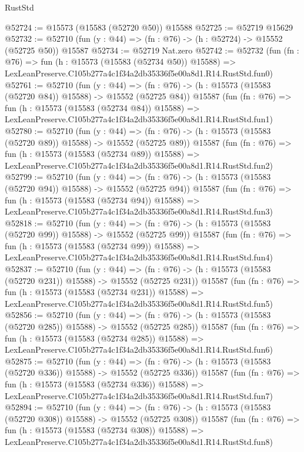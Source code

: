 \begin{lexlean}{RustStd}
\begin{coremodule}
@52724 := @15573 (@15583 (@52720 @50)) @15588
@52725 := @52719 @15629
@52732 := @52710 (fun (y : @44) => (fn : @76) -> (h : @52724) -> @15552 (@52725 @50)) @15587
@52734 := @52719 Nat.zero
@52742 := @52732
    (fun (fn : @76) =>
    fun (h : @15573 (@15583 (@52734 @50)) @15588) =>
    LexLeanPreserve.C105b277a4c1f34a2db35336f5e00a8d1.R14.RustStd.fun0)
@52761 := @52710
    (fun (y : @44) =>
    (fn : @76) -> (h : @15573 (@15583 (@52720 @84)) @15588) -> @15552 (@52725 @84))
    @15587
    (fun (fn : @76) =>
    fun (h : @15573 (@15583 (@52734 @84)) @15588) =>
    LexLeanPreserve.C105b277a4c1f34a2db35336f5e00a8d1.R14.RustStd.fun1)
@52780 := @52710
    (fun (y : @44) =>
    (fn : @76) -> (h : @15573 (@15583 (@52720 @89)) @15588) -> @15552 (@52725 @89))
    @15587
    (fun (fn : @76) =>
    fun (h : @15573 (@15583 (@52734 @89)) @15588) =>
    LexLeanPreserve.C105b277a4c1f34a2db35336f5e00a8d1.R14.RustStd.fun2)
@52799 := @52710
    (fun (y : @44) =>
    (fn : @76) -> (h : @15573 (@15583 (@52720 @94)) @15588) -> @15552 (@52725 @94))
    @15587
    (fun (fn : @76) =>
    fun (h : @15573 (@15583 (@52734 @94)) @15588) =>
    LexLeanPreserve.C105b277a4c1f34a2db35336f5e00a8d1.R14.RustStd.fun3)
@52818 := @52710
    (fun (y : @44) =>
    (fn : @76) -> (h : @15573 (@15583 (@52720 @99)) @15588) -> @15552 (@52725 @99))
    @15587
    (fun (fn : @76) =>
    fun (h : @15573 (@15583 (@52734 @99)) @15588) =>
    LexLeanPreserve.C105b277a4c1f34a2db35336f5e00a8d1.R14.RustStd.fun4)
@52837 := @52710
    (fun (y : @44) =>
    (fn : @76) -> (h : @15573 (@15583 (@52720 @231)) @15588) -> @15552 (@52725 @231))
    @15587
    (fun (fn : @76) =>
    fun (h : @15573 (@15583 (@52734 @231)) @15588) =>
    LexLeanPreserve.C105b277a4c1f34a2db35336f5e00a8d1.R14.RustStd.fun5)
@52856 := @52710
    (fun (y : @44) =>
    (fn : @76) -> (h : @15573 (@15583 (@52720 @285)) @15588) -> @15552 (@52725 @285))
    @15587
    (fun (fn : @76) =>
    fun (h : @15573 (@15583 (@52734 @285)) @15588) =>
    LexLeanPreserve.C105b277a4c1f34a2db35336f5e00a8d1.R14.RustStd.fun6)
@52875 := @52710
    (fun (y : @44) =>
    (fn : @76) -> (h : @15573 (@15583 (@52720 @336)) @15588) -> @15552 (@52725 @336))
    @15587
    (fun (fn : @76) =>
    fun (h : @15573 (@15583 (@52734 @336)) @15588) =>
    LexLeanPreserve.C105b277a4c1f34a2db35336f5e00a8d1.R14.RustStd.fun7)
@52894 := @52710
    (fun (y : @44) =>
    (fn : @76) -> (h : @15573 (@15583 (@52720 @308)) @15588) -> @15552 (@52725 @308))
    @15587
    (fun (fn : @76) =>
    fun (h : @15573 (@15583 (@52734 @308)) @15588) =>
    LexLeanPreserve.C105b277a4c1f34a2db35336f5e00a8d1.R14.RustStd.fun8)

\end{coremodule}
\end{lexlean}
